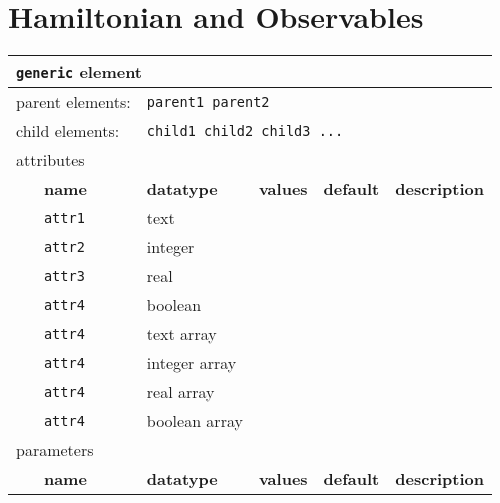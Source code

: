 \chapter{Hamiltonian and Observables}
\label{chap:hamiltobs}



\begin{table}[h]
\begin{center}
\begin{tabularx}{\textwidth}{l l l l l l }
\hline
\multicolumn{6}{l}{\texttt{generic} element} \\
\hline
\multicolumn{2}{l}{parent elements:} & \multicolumn{4}{l}{\texttt{parent1 parent2}}\\
\multicolumn{2}{l}{child  elements:} & \multicolumn{4}{l}{\texttt{child1 child2 child3 ...}}\\
\multicolumn{2}{l}{attributes}  & \multicolumn{4}{l}{}\\
   &   \bfseries name     & \bfseries datatype & \bfseries values & \bfseries default   & \bfseries description \\
   &   \texttt{attr1}     &  text              &                  &                     &                       \\
   &   \texttt{attr2}     &  integer           &                  &                     &                       \\
   &   \texttt{attr3}     &  real              &                  &                     &                       \\
   &   \texttt{attr4}     &  boolean           &                  &                     &                       \\
   &   \texttt{attr4}     &  text array        &                  &                     &                       \\
   &   \texttt{attr4}     &  integer array     &                  &                     &                       \\
   &   \texttt{attr4}     &  real array        &                  &                     &                       \\
   &   \texttt{attr4}     &  boolean array     &                  &                     &                       \\
\multicolumn{2}{l}{parameters}  & \multicolumn{4}{l}{}\\
   &   \bfseries name     & \bfseries datatype & \bfseries values & \bfseries default   & \bfseries description \\

\end{tabularx}
\end{center}
\end{table}
